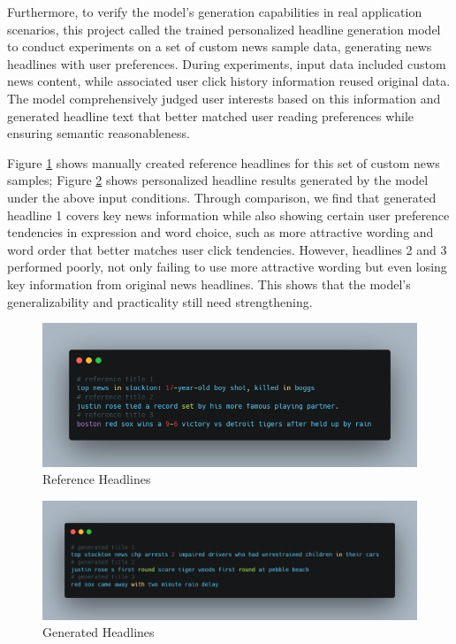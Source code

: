 \documentclass[10pt,a4paper]{article}
\begin{document}
Furthermore, to verify the model's generation capabilities in real application scenarios, this project called the trained personalized headline generation model to conduct experiments on a set of custom news sample data, generating news headlines with user preferences. During experiments, input data included custom news content, while associated user click history information reused original data. The model comprehensively judged user interests based on this information and generated headline text that better matched user reading preferences while ensuring semantic reasonableness.

Figure \ref{fig:ref} shows manually created reference headlines for this set of custom news samples; Figure \ref{fig:gen} shows personalized headline results generated by the model under the above input conditions. Through comparison, we find that generated headline 1 covers key news information while also showing certain user preference tendencies in expression and word choice, such as more attractive wording and word order that better matches user click tendencies. However, headlines 2 and 3 performed poorly, not only failing to use more attractive wording but even losing key information from original news headlines. This shows that the model's generalizability and practicality still need strengthening.

\begin{figure}[H]
  \centering
  \includegraphics[width=13.5cm]{fig/reference.png}
  \caption{Reference Headlines}\label{fig:ref}
\end{figure}
\begin{figure}[H]
  \centering
  \includegraphics[width=13.5cm]{fig/generated.png}
  \caption{Generated Headlines}\label{fig:gen}
\end{figure}
\end{document}
